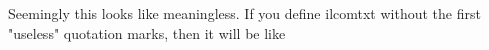 Seemingly this looks like meaningless. 
If you define ilcom{txt} without the first "useless" quotation marks, then it will be like\\
